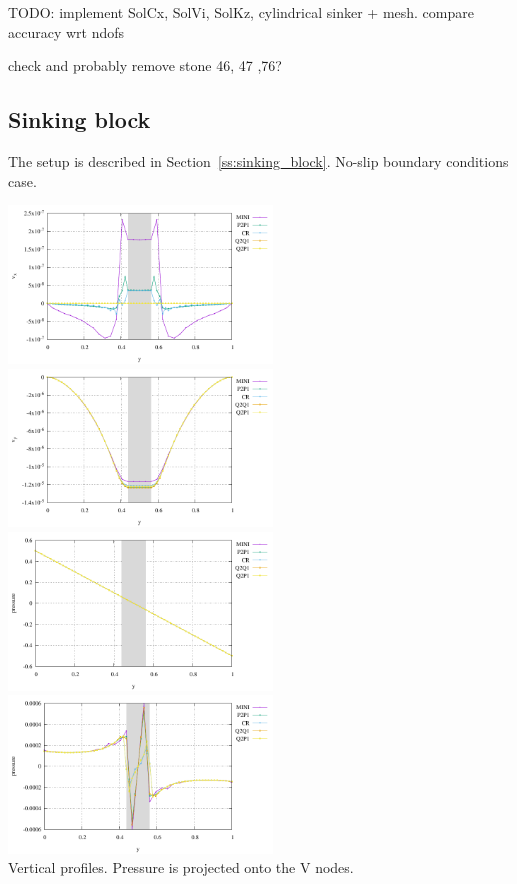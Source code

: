 TODO: implement SolCx, SolVi, SolKz, cylindrical sinker + mesh.
compare accuracy wrt ndofs

check and probably remove stone 46, 47 ,76?

\subsection*{Sinking block}

The setup is described in Section~\ref{ss:sinking_block}. No-slip boundary conditions case.

\begin{center}
\includegraphics[width=7cm]{python_codes/fieldstone_112/results/exp2/vprofile_u.pdf}
\includegraphics[width=7cm]{python_codes/fieldstone_112/results/exp2/vprofile_v.pdf}\\
\includegraphics[width=7cm]{python_codes/fieldstone_112/results/exp2/vprofile_p.pdf}
\includegraphics[width=7cm]{python_codes/fieldstone_112/results/exp2/vprofile_pdyn.pdf}\\
{\captionfont Vertical profiles. Pressure is projected onto the V nodes.}
\end{center}

